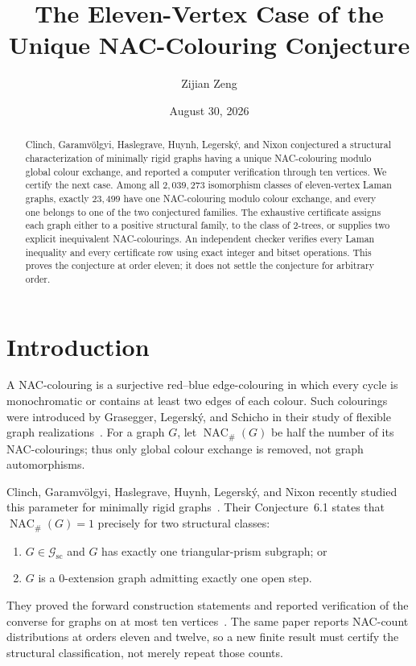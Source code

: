 \documentclass[11pt]{amsart}
\title[The eleven-vertex unique NAC-colouring conjecture]
{The Eleven-Vertex Case of the Unique NAC-Colouring Conjecture}
\author{Zijian Zeng}
\date{August 30, 2026}
\theoremstyle{definition}
\newcommand{\NACnum}{\operatorname{NAC}_{\#}}
\newcommand{\Gsc}{\mathcal G_{\mathrm{sc}}}
\begin{document}
\begin{abstract}
Clinch, Garamvölgyi, Haslegrave, Huynh, Legerský, and Nixon conjectured a
structural characterization of minimally rigid graphs having a unique
NAC-colouring modulo global colour exchange, and reported a computer
verification through ten vertices.  We certify the next case.  Among all
$2{,}039{,}273$ isomorphism classes of eleven-vertex Laman graphs, exactly
$23{,}499$ have one NAC-colouring modulo colour exchange, and every one belongs
to one of the two conjectured families.  The exhaustive certificate assigns
each graph either to a positive structural family, to the class of $2$-trees,
or supplies two explicit inequivalent NAC-colourings.  An independent checker
verifies every Laman inequality and every certificate row using exact integer
and bitset operations.  This proves the conjecture at order eleven; it does not
settle the conjecture for arbitrary order.
\end{abstract}

\maketitle

\section{Introduction}

A NAC-colouring is a surjective red--blue edge-colouring in which every cycle
is monochromatic or contains at least two edges of each colour.  Such
colourings were introduced by Grasegger, Legerský, and Schicho in their study
of flexible graph realizations~\cite{grasegger2019}.  For a graph $G$, let
$\NACnum(G)$ be half the number of its NAC-colourings; thus only global colour
exchange is removed, not graph automorphisms.

Clinch, Garamvölgyi, Haslegrave, Huynh, Legerský, and Nixon recently studied
this parameter for minimally rigid graphs~\cite{clinch2026}.  Their
Conjecture~6.1 states that $\NACnum(G)=1$ precisely for two structural classes:

\begin{enumerate}
\item $G\in\Gsc$ and $G$ has exactly one triangular-prism subgraph; or
\item $G$ is a $0$-extension graph admitting exactly one open step.
\end{enumerate}

They proved the forward construction statements and reported verification of
the converse for graphs on at most ten vertices~\cite[Conjecture~6.1 and the
following paragraph]{clinch2026}.  The same paper reports NAC-count
distributions at orders eleven and twelve, so a new finite result must certify
the structural classification, not merely repeat those counts.
\end{document}
